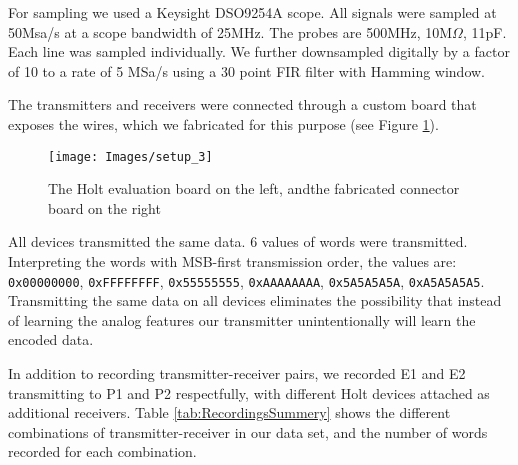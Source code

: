 \documentclass[conference]{IEEEtran}
\begin{document}
  For sampling we used a Keysight DSO9254A scope. All signals were sampled at 50Msa/s at a scope bandwidth of 25MHz. The probes are 500MHz, 10M\(\Omega\), 11pF. Each line was sampled individually. We further downsampled digitally by a factor of 10 to a rate of 5 MSa/s using a 30 point FIR filter with Hamming window.
  
  The transmitters and receivers were connected through a custom board that exposes the wires, which we fabricated for this purpose (see Figure \ref{fig:SetupImage}).
  
  \begin{figure}[t]
    \centering
    \texttt{[image: Images/setup\_3]}
    \caption{The Holt evaluation board on the left, andthe fabricated connector board on the right}
    \label{fig:SetupImage}
  \end{figure}
  
  All devices transmitted the same data. 6 values of words were transmitted. Interpreting the words with MSB-first transmission order, the values are: \texttt{0x00000000}, \texttt{0xFFFFFFFF}, \texttt{0x55555555}, \texttt{0xAAAAAAAA}, \texttt{0x5A5A5A5A}, \texttt{0xA5A5A5A5}. Transmitting the same data on all devices eliminates the possibility that instead of learning the analog features our transmitter unintentionally will learn the encoded data.
  
  In addition to recording transmitter-receiver pairs, we recorded E1 and E2 transmitting to P1 and P2 respectfully, with different Holt devices attached as additional receivers. Table \ref{tab:RecordingsSummery} shows the different combinations of transmitter-receiver in our data set, and the number of words recorded for each combination.
  
\end{document}
